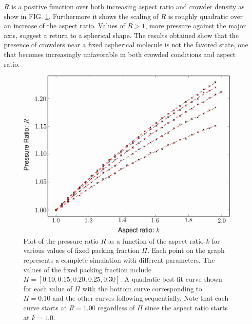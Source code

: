 $R$ is a positive function over both increasing aspect ratio and crowder density as show in FIG. \ref{fig:Pratio_plot}. Furthermore it shows the scaling of $R$ is roughly quadratic over an increase of the aspect ratio. Values of $R>1$, more pressure against the major axis, suggest a return to a spherical shape. The results obtained show that the presence of crowders near a fixed aspherical molecule is not the favored state, one that becomes increasingly unfavorable in both crowded conditions and aspect ratio. 

\begin{figure}
\includegraphics[width=\figurewidthSINGLE]{entropic_flow_paper/FIG4_EDIT.jpg}
\caption{Plot of the pressure ratio $R$ as a function of the aspect ratio $k$ for various values of fixed packing fraction $\Pi$. Each point on the graph represents a complete simulation with different parameters. The values of the fixed packing fraction include $\Pi=[0.10,0.15,0.20,0.25,0.30]$. A quadratic best fit curve shown for each value of $\Pi$ with the bottom curve corresponding to $\Pi=0.10$ and the other curves following sequentially. Note that each curve starts at $R=1.00$ regardless of $\Pi$ since the aspect ratio starts at $k=1.0$. }
\label{fig:Pratio_plot}
\end{figure}

